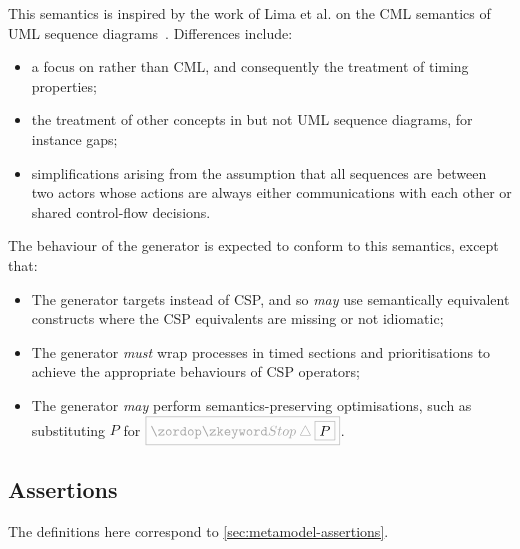 
This semantics is inspired by the work of Lima et al. on the CML semantics of
UML sequence diagrams~\cite{lima-semantics}.  Differences include:

\begin{itemize}
\item a focus on \tockcsp{} rather than CML, and consequently the
  treatment of timing properties;
\item
  the treatment of other concepts in \langname{} but not UML sequence
  diagrams, for instance gaps;
\item simplifications arising from the assumption that all sequences
  are between two actors whose actions are always either communications with
  each other or shared control-flow decisions.
\end{itemize}

The behaviour of the \langname{} generator is expected to conform to
this semantics, except that:

\begin{itemize}
\item
  The generator targets \cspm{} instead of CSP, and so \emph{may}
  use semantically equivalent \cspm{} constructs where the CSP equivalents
  are missing or not idiomatic;
\item
  The generator \emph{must} wrap processes in
  timed sections and prioritisations to achieve the appropriate \tockcsp{} behaviours of
  CSP operators;
\item
  The generator \emph{may} perform semantics-preserving optimisations,
  such as substituting \(P\) for \(\tlang{\Stop \interrupt \olang{P}}\).
\end{itemize}


\subsection{Assertions}

The definitions here correspond to \cref{sec:metamodel-assertions}.

